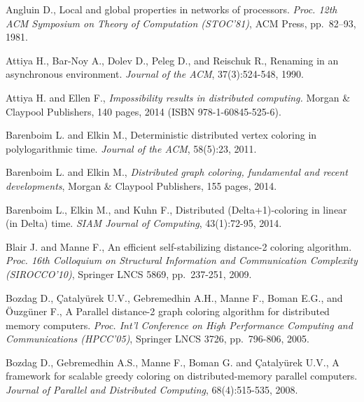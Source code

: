 \documentclass[11pt,english]{article}
\begin{document}
\begin{thebibliography}{99}
\footnotesize{

\vspace{-0.1cm}
Angluin D.,
Local and global properties in networks of processors.
{\it  Proc. 12th ACM Symposium on Theory of Computation (STOC'81)}, ACM Press,
pp.~82--93, 1981.


\vspace{-0.1cm}
Attiya H., Bar-Noy A., Dolev D., Peleg D., and Reischuk R., 
Renaming in an asynchronous environment.
{\it Journal of the ACM}, 37(3):524-548, 1990. 

\vspace{-0.1cm}
Attiya H. and Ellen F., 
{\it Impossibility results in distributed computing.}
Morgan \& Claypool Publishers,  140  pages, 2014
(ISBN 978-1-60845-525-6). 


\vspace{-0.1cm}
Barenboim L. and  Elkin M.,
Deterministic distributed vertex coloring in polylogarithmic time. 
{\it Journal of the ACM},  58(5):23, 2011.

\vspace{-0.1cm}
Barenboim L. and  Elkin M.,
{\it Distributed graph coloring, fundamental and recent developments}, 
Morgan \& Claypool Publishers,  155 pages, 2014. 

\vspace{-0.1cm}
Barenboim L.,  Elkin M., and  Kuhn F., 
Distributed (Delta+1)-coloring in linear (in Delta) time. 
{\it SIAM Journal of  Computing},  43(1):72-95, 2014. 


\vspace{-0.1cm}
Blair J. and Manne F.,
An efficient self-stabilizing distance-2 coloring algorithm.
{\it Proc.  16th  Colloquium on  Structural Information and Communication
Complexity  (SIROCCO'10)},  Springer LNCS 5869, pp.~237-251, 2009.


\vspace{-0.1cm}
Bozdag D.,  \c{C}ataly\"urek U.V.,  Gebremedhin A.H.,   Manne F., 
 Boman E.G., and  \"Ouzg\"uner F., 
A Parallel distance-2 graph coloring algorithm for
distributed memory computers. 
{\it Proc. Int'l Conference on High Performance Computing and Communications
 (HPCC'05)},  Springer LNCS 3726,  pp.~796-806, 2005. 


\vspace{-0.1cm}
Bozdag D.,  Gebremedhin A.S.,  Manne F., Boman G. and \c{C}ataly\"urek U.V.,
A framework for scalable greedy coloring on distributed-memory parallel 
computers.
{\it Journal of Parallel and Distributed  Computing},  68(4):515-535, 2008. 

}
\end{thebibliography}
\end{document}
